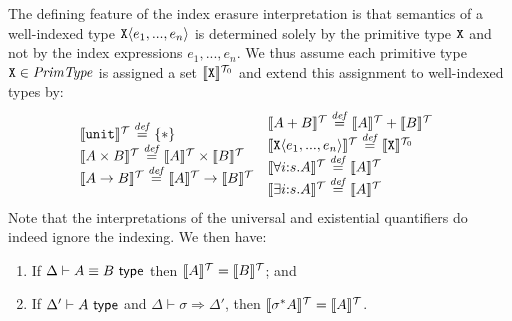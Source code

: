The defining feature of the index erasure interpretation is that 
semantics of a well-indexed type $\textup{\texttt{X}}\langle e_1,...,e_n \rangle$ is
determined solely by the primitive type $\textup{\texttt{X}}$ and not by the
index expressions $e_1,...,e_n$. %
We thus assume each
primitive type $\textup{\texttt{X}} \in \mathit{PrimType}$ is assigned a set
$\llbracket \textup{\texttt{X}} \rrbracket^{\mathcal{T}_0}$ and %
extend this assignment to %
well-indexed types by: %
\begin{displaymath}
  \begin{array}{@{}c@{\hspace{0em}}c@{}}
    \begin{array}{@{}l}
      \tySem{\tyUnit} \isDefinedAs \{*\} \\
      \tySem{A \tyProduct B} \isDefinedAs \tySem{A} \times \tySem{B} \\
      \tySem{A \tyArr B} \isDefinedAs \tySem{A} \to \tySem{B} \\
    \end{array}
    &
    \begin{array}{l}
      \tySem{A + B} \isDefinedAs \tySem{A} + \tySem{B} \\
      \tySem{\tyPrim{X}{e_1,...,e_n}} \isDefinedAs \tyPrimSem{\tyPrimNm{X}} \\
      \tySem{\forall i\mathord:s. A} \isDefinedAs \tySem{A} \\
      \tySem{\exists i\mathord:s. A} \isDefinedAs \tySem{A}
    \end{array}
  \end{array}
\end{displaymath}
Note that 
the interpretations of the
universal and existential quantifiers 
do indeed
ignore the indexing. %
We then have:

\begin{lemma}\label{lem:tyeqsubst-erasure}
  \begin{enumerate}
  \item If $\Delta \vdash A \equiv B \textup{\textsf{ type}}$ then $\llbracket A \rrbracket^{\mathcal{T}} =
    \llbracket B \rrbracket^{\mathcal{T}}$; and
  \item If $\Delta' \vdash A \textup{\textsf{ type}}$ and $\Delta \vdash \sigma
    \Rightarrow \Delta'$, then $\llbracket \sigma^*A \rrbracket^{\mathcal{T}} = \llbracket A \rrbracket^{\mathcal{T}}$.
  \end{enumerate}
\end{lemma}

